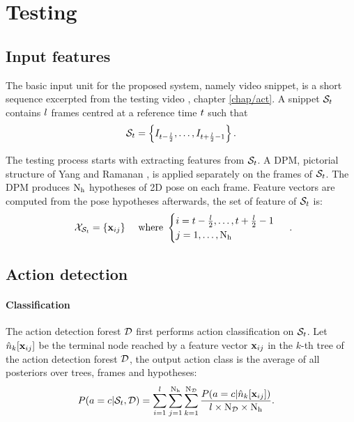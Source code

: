 \section{Testing}

\subsection{Input features}

The basic input unit for the proposed system, namely video snippet, is a short sequence excerpted from the testing video \cite{Schindler2008}, \cf chapter \ref{chap/act}. A snippet $\mathcal{S}_{t}$ contains $l$ frames centred at a reference time $t$ such that
\begin{equation}
	\label{eqn/body/snippetnow}
	\mathcal{S}_{t} = \left\{ I_{t - \frac{l}{2}}, \dots, I_{t + \frac{l}{2} - 1} \right\}.
\end{equation}

The testing process starts with extracting features from $\mathcal{S}_{t}$. A DPM, \eg pictorial structure of Yang and Ramanan \cite{Yang2011}, is applied separately on the frames of $\mathcal{S}_{t}$. The DPM produces $\mathrm{N_{h}}$ hypotheses of 2D pose on each frame. Feature vectors are computed from the pose hypotheses afterwards, the set of feature of $\mathcal{S}_{t}$ is:
\begin{equation}
	\begin{array}{lr}
		\mathcal{X}_{\mathcal{S}_{t}} = \{ \mathbf{x}_{ij}\} & \mbox{ where } 
		\begin{cases}
			i =t-\frac{l}{2},\dots,t+\frac{l}{2}-1 \\ 
			j=1,\dots,\mathrm{N_{h}}
		\end{cases}
	\end{array}.
\end{equation} 

\subsection{Action detection} 

\paragraph{Classification}
The action detection forest $\mathcal{D}$ first performs action classification on $\mathcal{S}_{t}$. Let ${\hat{n}}_k[\mathbf{x}_{ij}]$ be the terminal node reached by a feature vector $\mathbf{x}_{ij}$ in the $k$-th tree of the action detection forest $\mathcal{D}$, the output action class is the average of all posteriors over trees, frames and hypotheses:   
\begin{equation}
	\label{eqn/body/actionclassification} 
	\begin{aligned}
	P(a & = c | \mathcal{S}_{t}, \mathcal{D}) = \displaystyle \sum_{i = 1}^{l} \sum_{j = 1}^{\mathrm{N_{h}}} \sum_{k = 1}^{\mathrm{N_{\mathcal{D}}}} \frac {P(a=c|{\hat{n}}_{k}[\mathbf{x}_{ij}])} {l\times\mathrm{N_{\mathcal{D}}}\times\mathrm{N_{h}}}.
	\end{aligned}
\end{equation}


